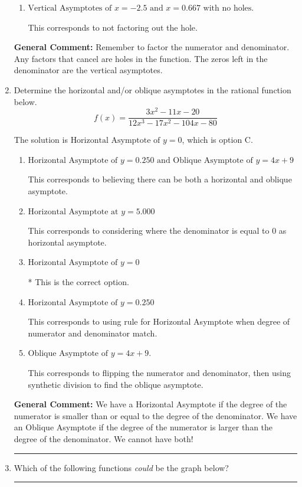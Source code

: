 \documentclass{extbook}[14pt]
\newcommand{\litem}[1]{\item #1

\rule{\textwidth}{0.4pt}}
\begin{document}
\begin{enumerate}
{\begin{enumerate}[label=\Alph*.]
This corresponds to considering where the denominator is equal to 0 as holes.
\item \( \text{Vertical Asymptotes of } x = -2.5 \text{ and } x = 0.667 \text{ with no holes.} \)

This corresponds to not factoring out the hole.
\end{enumerate}

\textbf{General Comment:} Remember to factor the numerator and denominator. Any factors that cancel are holes in the function. The zeros left in the denominator are the vertical asymptotes.
}
\litem{
Determine the horizontal and/or oblique asymptotes in the rational function below.
\[ f(x) = \frac{3x^{2} -11 x -20}{12x^{3} -17 x^{2} -104 x -80} \]

The solution is \( \text{Horizontal Asymptote of } y = 0 \), which is option C.\begin{enumerate}[label=\Alph*.]
\item \( \text{Horizontal Asymptote of } y = 0.250 \text{ and Oblique Asymptote of } y = 4x + 9 \)

This corresponds to believing there can be both a horizontal and oblique asymptote.
\item \( \text{Horizontal Asymptote at } y = 5.000 \)

This corresponds to considering where the denominator is equal to 0 as horizontal asymptote.
\item \( \text{Horizontal Asymptote of } y = 0 \)

* This is the correct option.
\item \( \text{Horizontal Asymptote of } y = 0.250  \)

This corresponds to using rule for Horizontal Asymptote when degree of numerator and denominator match.
\item \( \text{Oblique Asymptote of } y = 4x + 9. \)

This corresponds to flipping the numerator and denominator, then using synthetic division to find the oblique asymptote.
\end{enumerate}

\textbf{General Comment:} We have a Horizontal Asymptote if the degree of the numerator is smaller than or equal to the degree of the denominator. We have an Oblique Asymptote if the degree of the numerator is larger than the degree of the denominator. We cannot have both!
}
\litem{
Which of the following functions \textit{could} be the graph below?

}
\end{enumerate}
\end{document}
